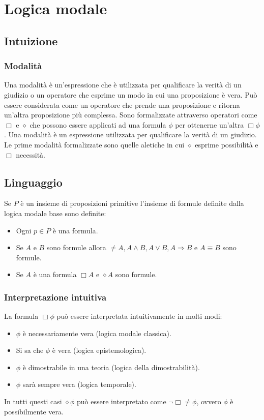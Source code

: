 \chapter{Logica modale}
\section{Intuizione}
\subsection{Modalit\`a}
Una modalit\`a \`e un'espressione che \`e utilizzata per qualificare la verit\`a di un giudizio o un operatore che esprime un modo in cui una proposizione \`e vera. Pu\`o essere considerata come un operatore che 
prende una proposizione e ritorna un'altra proposizione pi\`u complessa. Sono formalizzate attraverso operatori come $\Box$ e $\diamond$ che possono essere applicati ad una formula $\phi$ per ottenerne
un'altra $\Box \phi$. Una modalit\`a \`e un espressione utilizzata per qualificare la verit\`a di un giudizio. Le prime modalit\`a formalizzate sono quelle aletiche in cui $\diamond$ esprime possibilit\`a
e $\Box$ necessit\`a. 
\section{Linguaggio}
Se $P$ \`e un insieme di proposizioni primitive l'insieme di formule definite dalla logica modale base sono definite:
\begin{itemize}
\item Ogni $p\in P$ \`e una formula.
\item Se $A$ e $B$ sono formule allora $\neq A, A\land B, A\lor B, A\Rightarrow B$ e $A\equiv B$ sono formule.
\item Se $A$ \`e una formula $\Box A$ e $\diamond A$ sono formule.
\end{itemize}
\subsection{Interpretazione intuitiva}
La formula $\Box\phi$ pu\`o essere interpretata intuitivamente in molti modi:
\begin{itemize}
\item $\phi$ \`e necessariamente vera (logica modale classica).
\item Si sa che $\phi$ \`e vera (logica epistemologica).
\item $\phi$ \`e dimostrabile in una teoria (logica della dimostrabilit\`a).
\item $\phi$ sar\`a sempre vera (logica temporale).
\end{itemize}
In tutti 	questi casi $\diamond\phi$ pu\`o essere interpretato come $\neg\Box\neq\phi$, ovvero $\phi$ \`e possibilmente vera.
